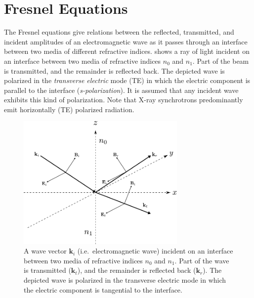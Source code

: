 \documentclass[10pt,twoside, b5paper,pdftex]{report}
\begin{document}
\section{Fresnel Equations \label{sec:fresnel}}
The Fresnel equations give relations between the reflected, transmitted, and incident amplitudes of an electromagnetic wave as it passes through an interface between two media of different refractive indices. 
%
 shows a ray of light incident on an interface between two media of refractive indices $n_{0}$ and $n_{1}$. Part of the beam is transmitted, and the remainder is reflected back. The depicted wave is polarized in the {\it transverse electric} mode (TE)  in which the electric component is parallel to the interface ({\it s-polarization}). It is assumed that any incident wave exhibits this kind of polarization. Note that X-ray synchrotrons predominantly emit horizontally (TE) polarized radiation.
\begin{figure}[htbp]
	\begin{center}
		\includegraphics[width=0.73\textwidth]{figures/te.pdf}		
	\end{center}
	\caption{A wave vector $\mathbf{k}_i$ (i.e.~electromagnetic wave) incident on an interface between two media of refractive indices $n_{0}$ and $n_{1}$. Part of the wave is transmitted ($\mathbf{k}_t$), and the remainder is reflected back ($\mathbf{k}_r$). The depicted wave is polarized in the transverse electric mode in which the electric component is tangential to the interface. \label{fig:te}}
\end{figure}
\end{document}
